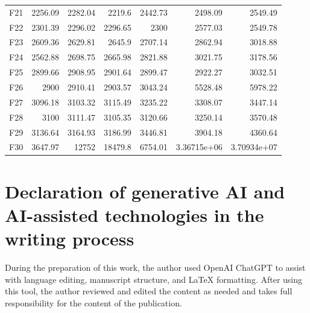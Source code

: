 \documentclass[a4paper,fleqn]{cas-sc}
\begin{document}
\begin{table}[H]
{\begin{tabular}{lrrr|rrr}
F21 & 2256.09 & 2282.04 & 2219.6 & 2442.73 & 2498.09 & 2549.49\\
F22 & 2301.39 & 2296.02 & 2296.65 & 2300 & 2577.03 & 2549.78\\
F23 & 2609.36 & 2629.81 & 2645.9 & 2707.14 & 2862.94 & 3018.88\\
F24 & 2562.88 & 2698.75 & 2665.98 & 2821.88 & 3021.75 & 3178.56\\
F25 & 2899.66 & 2908.95 & 2901.64 & 2899.47 & 2922.27 & 3032.51\\
F26 & 2900 & 2910.41 & 2903.57 & 3043.24 & 5528.48 & 5978.22\\
F27 & 3096.18 & 3103.32 & 3115.49 & 3235.22 & 3308.07 & 3447.14\\
F28 & 3100 & 3111.47 & 3105.35 & 3120.66 & 3250.14 & 3570.48\\
F29 & 3136.64 & 3164.93 & 3186.99 & 3446.81 & 3904.18 & 4360.64\\
F30 & 3647.97 & 12752 & 18479.8 & 6754.01 & 3.36715e+06 & 3.70934e+07\\
\bottomrule
\end{tabular}}
\end{table}
\clearpage

\section*{Declaration of generative AI and AI-assisted technologies in the writing process}

During the preparation of this work, the author used OpenAI ChatGPT to assist with language editing, manuscript structure, and \LaTeX{} formatting. After using this tool, the author reviewed and edited the content as needed and takes full responsibility for the content of the publication.

\printcredits
\end{document}
